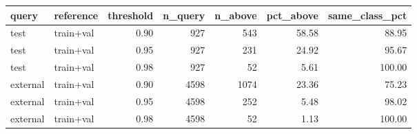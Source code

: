 \begin{tabular}{llrrrrr}
\toprule
query & reference & threshold & n\_query & n\_above & pct\_above & same\_class\_pct \\
\midrule
test & train+val & 0.90 & 927 & 543 & 58.58 & 88.95 \\
test & train+val & 0.95 & 927 & 231 & 24.92 & 95.67 \\
test & train+val & 0.98 & 927 & 52 & 5.61 & 100.00 \\
external & train+val & 0.90 & 4598 & 1074 & 23.36 & 75.23 \\
external & train+val & 0.95 & 4598 & 252 & 5.48 & 98.02 \\
external & train+val & 0.98 & 4598 & 52 & 1.13 & 100.00 \\
\bottomrule
\end{tabular}
